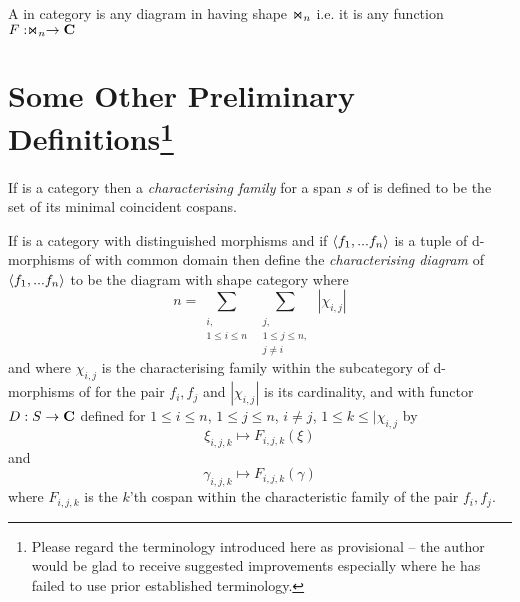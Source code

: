 \documentclass[10pt,a4paper]{article}
\begin{document}
\begin{definition}
A \textit{\ndidlycospan}
 in category   is any diagram in  having 
shape $\Join_n$  i.e. it is any function $F: \Join_n \rightarrow \textbf{C}$
\end{definition}

\section{ Some Other Preliminary Definitions\protect\footnote{Please regard the terminology introduced here as provisional -- the author would be glad to receive suggested improvements especially where he has failed to use prior established terminology.}}

\begin{definition}
\noindent If  is a category  then a \textit{characterising family} for a span $s$ of  is defined to be the set of its minimal coincident cospans.
\end{definition}


\noindent 

\begin{definition}
If  is a category with distinguished morphisms 
and if $\left\langle f_1,...f_n\right\rangle$ is a tuple of d-morphisms of  
with common domain then define the \textit{characterising diagram} of 
$\left\langle f_1,...f_n\right\rangle$
to be the diagram with shape category \ndidly where 
$$n = 
\sum_{\substack{i,\\1 \leq i \leq n}} \  \sum_{\substack{j,\\ 1 \leq j \leq n,\\ j \neq i}} \ | \chi_{i,j} | $$
and where $\chi_{i,j}$ is the characterising family within the subcategory 
of d-morphisms of  for the pair $f_i,f_j$ and 
$|\chi_{i,j}|$ is its cardinality,
and with functor $D: S \rightarrow \textbf{C}$ defined for $1 \leq i \leq n$, $1 \leq j \leq n$, $i \neq j$, $1 \leq k \leq | \chi_{i,j}$ by
$$ \xi_{i,j,k}   \mapsto F_{i,j,k}(\xi)$$
and
$$ \gamma_{i,j,k}   \mapsto F_{i,j,k}(\gamma) $$
where $F_{i,j,k}$ is the $k$'th cospan within the characteristic family of the pair $f_i,f_j$.
\end{definition}
\end{document}

